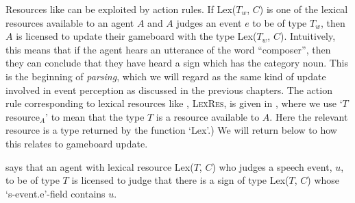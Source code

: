 Resources like \preveg{} can be exploited by action rules.  If
Lex($T_w$, $C$)
is one of the lexical resources available to an agent $A$
and $A$ judges an event $e$ to be of type $T_w$, then $A$ is
licensed to update their gameboard with the type Lex($T_w$, $C$).
Intuitively, this means that if the agent hears an utterance of the
word ``composer'', then they can conclude that they have heard a sign
which has the category noun.  This is the beginning of
\textit{parsing}, which we will regard as the same kind of update
involved in event perception as discussed in the previous chapters.
The action rule corresponding to lexical resources
like \preveg{}, \textsc{LexRes}, is given in \nexteg{}, where we use `$T$
resource$_A$' to mean that the type $T$ is a resource available to
$A$.  Here the relevant resource is a type returned by the function `Lex'.)  We will return below to how
this relates to gameboard update.  
\begin{ex}
  \begin{prooftree}
  \end{prooftree}
  

\end{ex} 
\preveg{} says that an agent with lexical resource Lex($T$, $C$) who
judges a speech event, $u$, to be of type $T$ is licensed to judge that
there is a sign of type Lex($T$, $C$) whose `s-event.e'-field contains
$u$. 

